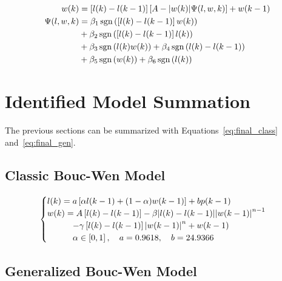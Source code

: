 \begin{equation}
\begin{split}
w(k) &= \left[l(k)-l(k-1)\right]\left[A-\abs{w(k)}\Psi(l,w,k)\right]+w(k-1) \\
\Psi(l,w,k) &= \beta_1\operatorname{sgn}\left(\left[l(k)-l(k-1)\right]w(k)\right) \\
&+\beta_2\operatorname{sgn}\left(\left[l(k)-l(k-1)\right]l(k)\right) \\
&+\beta_3\operatorname{sgn}\left(l(k)w(k)\right) + \beta_4\operatorname{sgn}\left(l(k)-l(k-1)\right) \\
&+\beta_5 \operatorname{sgn}\left(w(k)\right) + \beta_6 \operatorname{sgn}\left(l(k)\right)
\end{split}
\label{eq:w_generalized}
\end{equation}

\section{Identified Model Summation}

The previous sections can be summarized with Equations~\ref{eq:final_class} and~\ref{eq:final_gen}.

\subsection{Classic Bouc-Wen Model}

\begin{equation}
	\begin{cases}
		l(k) = a \left [\alpha l(k-1) + (1-\alpha)w(k-1) \right] + bp(k-1) \\
		w(k) = A\left[l(k)-l(k-1)\right] - \beta \abs{l(k)-l(k-1)}\abs{w(k-1)}^{n-1} \\
		\qquad \quad- \gamma \left[l(k)-l(k-1)\right]\abs{w(k-1)}^n + w(k-1) \\
		\qquad \quad \alpha \in \left[0,1\right],\quad a = 0.9618, \quad b=24.9366
	\end{cases}
	\label{eq:final_class}
\end{equation}

\subsection{Generalized Bouc-Wen Model}

